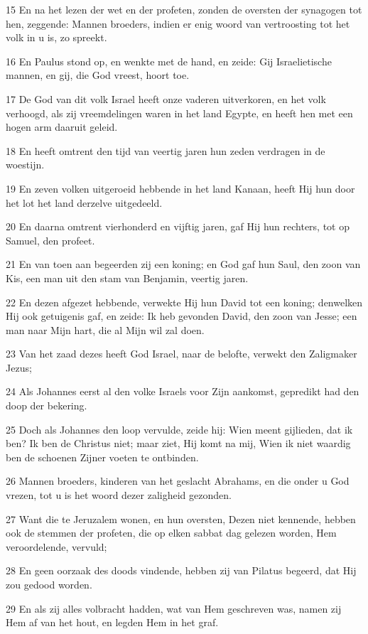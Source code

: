 \par 15 En na het lezen der wet en der profeten, zonden de oversten der synagogen tot hen, zeggende: Mannen broeders, indien er enig woord van vertroosting tot het volk in u is, zo spreekt.
\par 16 En Paulus stond op, en wenkte met de hand, en zeide: Gij Israelietische mannen, en gij, die God vreest, hoort toe.
\par 17 De God van dit volk Israel heeft onze vaderen uitverkoren, en het volk verhoogd, als zij vreemdelingen waren in het land Egypte, en heeft hen met een hogen arm daaruit geleid.
\par 18 En heeft omtrent den tijd van veertig jaren hun zeden verdragen in de woestijn.
\par 19 En zeven volken uitgeroeid hebbende in het land Kanaan, heeft Hij hun door het lot het land derzelve uitgedeeld.
\par 20 En daarna omtrent vierhonderd en vijftig jaren, gaf Hij hun rechters, tot op Samuel, den profeet.
\par 21 En van toen aan begeerden zij een koning; en God gaf hun Saul, den zoon van Kis, een man uit den stam van Benjamin, veertig jaren.
\par 22 En dezen afgezet hebbende, verwekte Hij hun David tot een koning; denwelken Hij ook getuigenis gaf, en zeide: Ik heb gevonden David, den zoon van Jesse; een man naar Mijn hart, die al Mijn wil zal doen.
\par 23 Van het zaad dezes heeft God Israel, naar de belofte, verwekt den Zaligmaker Jezus;
\par 24 Als Johannes eerst al den volke Israels voor Zijn aankomst, gepredikt had den doop der bekering.
\par 25 Doch als Johannes den loop vervulde, zeide hij: Wien meent gijlieden, dat ik ben? Ik ben de Christus niet; maar ziet, Hij komt na mij, Wien ik niet waardig ben de schoenen Zijner voeten te ontbinden.
\par 26 Mannen broeders, kinderen van het geslacht Abrahams, en die onder u God vrezen, tot u is het woord dezer zaligheid gezonden.
\par 27 Want die te Jeruzalem wonen, en hun oversten, Dezen niet kennende, hebben ook de stemmen der profeten, die op elken sabbat dag gelezen worden, Hem veroordelende, vervuld;
\par 28 En geen oorzaak des doods vindende, hebben zij van Pilatus begeerd, dat Hij zou gedood worden.
\par 29 En als zij alles volbracht hadden, wat van Hem geschreven was, namen zij Hem af van het hout, en legden Hem in het graf.
